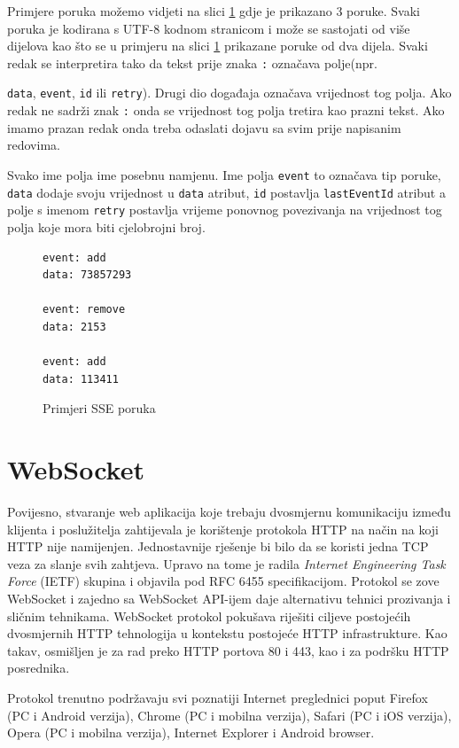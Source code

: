 \documentclass[times, utf8, zavrsni]{fer}
\begin{document}
Primjere poruka možemo vidjeti na slici \ref{lst:sse-messages} gdje je prikazano 3 poruke. Svaki poruka je kodirana s UTF-8 kodnom stranicom i može se sastojati od više dijelova kao što se u primjeru na slici \ref{lst:sse-messages} prikazane poruke od dva dijela. Svaki redak se interpretira tako da tekst prije znaka {\tt :} označava polje(npr. {{\tt data}, {\tt event}, {\tt id} ili {\tt retry}). Drugi dio događaja označava vrijednost tog polja. Ako redak ne sadrži znak {\tt :} onda se vrijednost tog polja tretira kao prazni tekst. Ako imamo prazan redak onda treba odaslati dojavu sa svim prije napisanim redovima.

Svako ime polja ime posebnu namjenu. Ime polja {\tt event} to označava tip poruke, {\tt data} dodaje svoju vrijednost u {\tt data} atribut, {\tt id} postavlja {\tt lastEventId} atribut a polje s imenom {\tt retry} postavlja vrijeme ponovnog povezivanja na vrijednost tog polja koje mora biti cjelobrojni broj.\citep{sse2017}

\begin{figure}
\begin{lstlisting}
event: add
data: 73857293

event: remove
data: 2153

event: add
data: 113411
\end{lstlisting}
\caption{Primjeri SSE poruka}
\label{lst:sse-messages}
\end{figure}

\section{WebSocket}
Povijesno, stvaranje web aplikacija koje trebaju dvosmjernu komunikaciju između klijenta i poslužitelja zahtijevala je korištenje protokola HTTP na način na koji HTTP nije namijenjen. Jednostavnije rješenje bi bilo da se koristi jedna TCP veza za slanje svih zahtjeva. Upravo na tome je radila {\em Internet Engineering Task Force} (IETF) skupina i objavila pod RFC 6455 specifikacijom. Protokol se zove WebSocket i zajedno sa WebSocket API-ijem daje alternativu tehnici prozivanja i sličnim tehnikama. WebSocket protokol pokušava riješiti ciljeve postojećih dvosmjernih HTTP tehnologija u kontekstu postojeće HTTP infrastrukture. Kao takav, osmišljen je za rad preko HTTP portova 80 i 443, kao i za podršku HTTP posrednika.

Protokol trenutno podržavaju svi poznatiji Internet preglednici poput Firefox (PC i Android verzija), Chrome (PC i mobilna verzija), Safari (PC i iOS verzija), Opera (PC i mobilna verzija), Internet Explorer i Android browser.

}
\end{document}

